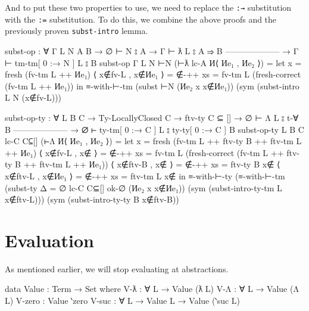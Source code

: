 \documentclass[logo,bsc,singlespacing,parskip,online]{infthesis}
\begin{document}
And to put these two properties to use, we need to replace the \texttt{:→} substitution with the
\texttt{:=} substitution. To do this, we combine the above proofs and the previously proven
\texttt{subst-intro} lemma.
\begin{code}
  subst-op : ∀ {Γ L N A B}
    → ∅ ⊢ N ⦂ A
    → Γ ⊢ ƛ L ⦂ A ⇒ B
      --------------------
    → Γ ⊢ tm-tm[ 0 :→ N ] L ⦂ B
  subst-op {Γ} {L} {N} ⊢N (⊢ƛ lc-A И⟨ Иe₁ , Иe₂ ⟩) =
    let x                  = fresh (fv-tm L ++ Иe₁)
        ⟨ x∉fv-L , x∉Иe₁ ⟩ = ∉-++ {xs = fv-tm L}
                                (fresh-correct (fv-tm L ++ Иe₁))
    in ≡-with-⊢-tm (subst ⊢N (Иe₂ x {x∉Иe₁}))
      (sym (subst-intro L N (x∉fv-L)))

  subst-op-ty : ∀ {L B C}
    → Ty-LocallyClosed C
    → ftv-ty C ⊆ []
    → ∅ ⊢ Λ L ⦂ t-∀ B
      --------------------
    → ∅ ⊢ ty-tm[ 0 :→ C ] L ⦂ ty-ty[ 0 :→ C ] B
  subst-op-ty {L} {B} {C} lc-C C⊆[] (⊢Λ И⟨ Иe₁ , Иe₂ ⟩) =
    let x = fresh (fv-tm L ++ ftv-ty B ++ ftv-tm L ++ Иe₁)
        ⟨ x∉fv-L , x∉ ⟩ = ∉-++ {xs = fv-tm L}
          (fresh-correct (fv-tm L ++ ftv-ty B ++ ftv-tm L ++ Иe₁))
        ⟨ x∉ftv-B , x∉ ⟩ = ∉-++ {xs = ftv-ty B} x∉
        ⟨ x∉ftv-L , x∉Иe₁ ⟩ = ∉-++ {xs = ftv-tm L} x∉
    in ≡-with-⊢-ty (≡-with-⊢-tm
          (subst-ty {Δ = ∅} lc-C C⊆[] ok-∅ (Иe₂ x {x∉Иe₁}))
          (sym (subst-intro-ty-tm L x∉ftv-L)))
      (sym (subst-intro-ty-ty B x∉ftv-B))
\end{code}

\section{Evaluation}
As mentioned earlier, we will stop evaluating at abstractions.
\begin{code}
  data Value : Term → Set where
    V-ƛ : ∀ {L} → Value (ƛ L)
    V-Λ : ∀ {L} → Value (Λ L)
    V-zero : Value ‵zero
    V-suc : ∀ {L} → Value L → Value (‵suc L)
\end{code}
\end{document}
